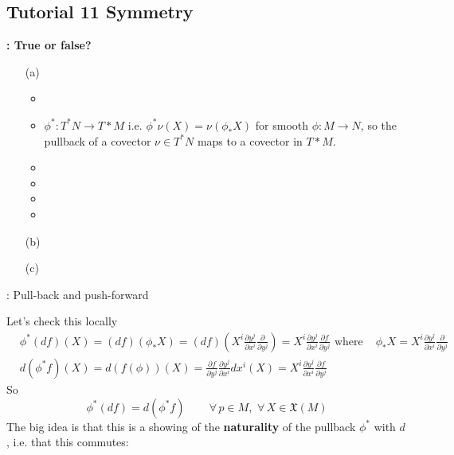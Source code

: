 \subsection*{Tutorial 11 Symmetry }

\textbf{: True or false?}

\begin{enumerate}
\item[(a)]
\begin{itemize}
\item
\item $\phi^*:T^*N \to T*M$ i.e. $\phi^*\nu(X) = \nu(\phi_*X)$ for smooth $\phi:M \to N$, so the pullback of a covector $\nu \in T^*N$ maps to a covector in $T*M$.  
\item
\item
\item
\item
\end{itemize}
\item[(b)]
\item[(c)]
\end{enumerate}

: Pull-back and push-forward

\questionhead{}Let's check this locally
\[
\begin{aligned}
  & \phi^*(df)(X) = (df)(\phi_*X) = (df)(X^i \frac{ \partial y^j}{\partial x^i} \frac{ \partial }{ \partial y^j}  ) = X^i \frac{ \partial y^j}{ \partial x^i} \frac{ \partial f}{ \partial y^j} \text{ where } 
  & \phi_* X = X^i \frac{ \partial y^j}{ \partial x^i} \frac{ \partial }{ \partial y^j} \\ 
  & d(\phi^*f)(X) = d(f(\phi))(X) = \frac{ \partial f}{ \partial y^j} \frac{ \partial y^j}{ \partial x^i } dx^i(X) = X^i \frac{ \partial y^j}{ \partial x^i} \frac{ \partial f}{ \partial y^j}
\end{aligned}
\]
So 
\[
\boxed{ \phi^*(df) = d(\phi^* f)  } \quad \quad \, \forall \, p \in M , \, \, \forall \, X \in \mathfrak{X}(M)
\]
The big idea is that this is a showing of the \textbf{naturality} of the pullback $\phi^*$ with $d$, i.e. that this commutes:


